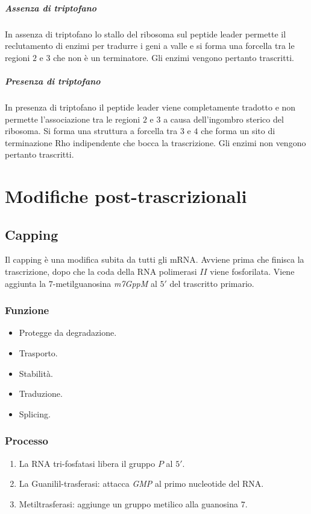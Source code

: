 				\subparagraph{Assenza di triptofano}
				In assenza di triptofano lo stallo del ribosoma sul peptide leader permette il reclutamento di enzimi per tradurre i geni a valle e si forma una forcella tra le regioni $2$ e $3$ che non \`e un terminatore.
				Gli enzimi vengono pertanto trascritti.

				\subparagraph{Presenza di triptofano}
				In presenza di triptofano il peptide leader viene completamente tradotto e non permette l'associazione tra le regioni $2$ e $3$ a causa dell'ingombro sterico del ribosoma.
				Si forma una struttura a forcella tra $3$ e $4$ che forma un sito di terminazione Rho indipendente che bocca la trascrizione.
				Gli enzimi non vengono pertanto trascritti.

\section{Modifiche post-trascrizionali}

	\subsection{Capping}
	Il capping \`e una modifica subita da tutti gli mRNA.
	Avviene prima che finisca la trascrizione, dopo che la coda della RNA polimerasi $II$ viene fosforilata.
	Viene aggiunta la $7$-metilguanosina \emph{m7GppM} al $5'$ del trascritto primario.

		\subsubsection{Funzione}
		\begin{multicols}{2}
			\begin{itemize}
				\item Protegge da degradazione.
				\item Trasporto.
				\item Stabilit\`a.
				\item Traduzione.
				\item Splicing.
			\end{itemize}
		\end{multicols}

		\subsubsection{Processo}
		\begin{multicols}{2}
			\begin{enumerate}
				\item La RNA tri-fosfatasi libera il gruppo $P$ al $5'$.
				\item La Guanilil-trasferasi: attacca \emph{GMP} al primo nucleotide del RNA.
				\item Metiltrasferasi: aggiunge un gruppo metilico alla guanosina $7$.
			\end{enumerate}
		\end{multicols}

